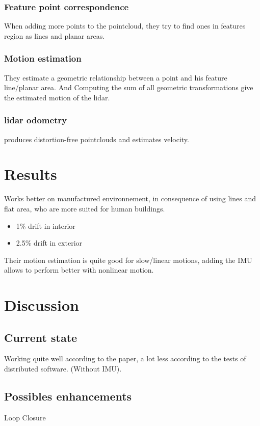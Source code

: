 \documentclass[twoside,twocolumn]{article}
\begin{document}
\subsubsection{Feature point correspondence}
When adding more points to the pointcloud, they try to find ones in features region as lines and planar areas.
\subsubsection{Motion estimation}
They estimate a geometric relationship between a point and his feature line/planar area.
And Computing the sum of all geometric transformations give the estimated motion of the lidar.
\subsubsection{lidar odometry}
produces distortion-free pointclouds and estimates velocity.






\section{Results}
Works better on manufactured environnement, in consequence of using lines and flat area, who are more suited for human buildings.
\begin{itemize}
  \item 1\% drift in interior
  \item 2.5\% drift in exterior
\end{itemize}
Their motion estimation is quite good for slow/linear motions, adding the IMU allows to perform better with nonlinear motion.

\section{Discussion}
\subsection{Current state}
Working quite well according to the paper, a lot less according to the tests of distributed software. (Without IMU).
\subsection{Possibles enhancements}
Loop Closure

\printbibliography
\end{document}
